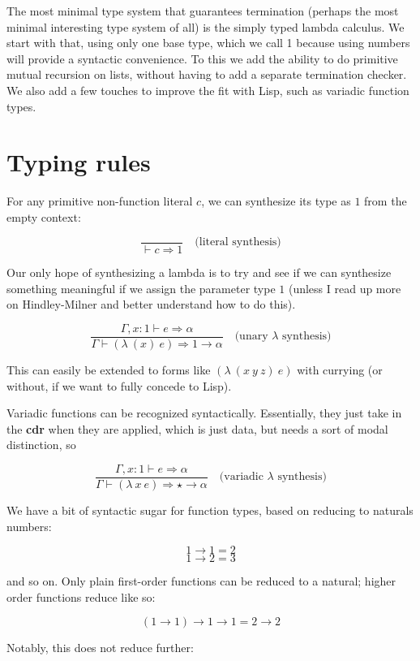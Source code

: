 \documentclass{article}
\begin{document}
The most minimal type system that guarantees termination (perhaps the most
minimal interesting type system of all) is the simply typed lambda calculus. We
start with that, using only one base type, which we call 1 because using numbers
will provide a syntactic convenience. To this we add the ability to do primitive
mutual recursion on lists, without having to add a separate termination checker.
We also add a few touches to improve the fit with Lisp, such as variadic
function types.

\section{Typing rules}

For any primitive non-function literal $c$, we can synthesize its type as $1$
from the empty context:

\[ \frac{}{\vdash{}c\mathbin{\Rightarrow}1}\quad\text{(literal synthesis)} \]

Our only hope of synthesizing a lambda is to try and see if we can synthesize
something meaningful if we assign the parameter type $1$ (unless I read up more
on Hindley-Milner and better understand how to do this).

\[ \frac{\Gamma,x\mathbin{:}1\vdash e\mathbin{\Rightarrow}\alpha}{\Gamma\vdash
    (\lambda~(x)~e)\mathbin{\Rightarrow}1\to\alpha}\quad\text{(unary
    $\lambda$ synthesis)} \]

This can easily be extended to forms like $(\lambda~(x~y~z)~e)$ with
currying (or without, if we want to fully concede to Lisp).

Variadic functions can be recognized syntactically. Essentially, they just take
in the \textbf{cdr} when they are applied, which is just data, but needs a
sort of modal distinction, so

\[ \frac{\Gamma,x\mathbin{:}1\vdash e\mathbin{\Rightarrow}\alpha}{\Gamma\vdash
    (\lambda~x~e)\mathbin{\Rightarrow}\star\to\alpha}\quad\text{(variadic
    $\lambda$ synthesis)} \]

We have a bit of syntactic sugar for function types, based on reducing to
naturals numbers:

\[ 1\to1 = 2 \]
\[ 1\to2 = 3 \]

and so on. Only plain first-order functions can be reduced to a natural;
higher order functions reduce like so:

\[ (1\to{}1)\to{}1\to{}1 = 2\to{}2 \]

Notably, this does not reduce further:
\end{document}

